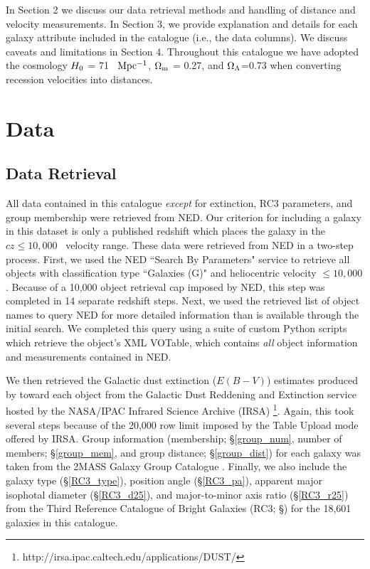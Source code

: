 In Section 2 we discuss our data retrieval methods and handling of distance and velocity measurements. In Section 3, we provide explanation and details for each galaxy attribute included in the catalogue (i.e., the data columns). We discuss caveats and limitations in Section 4. Throughout this catalogue we have adopted the cosmology $H_{\rm 0}$ = 71 \kms ~$\rm Mpc^{-1}$, $\rm \Omega_m$ = 0.27, and $\rm \Omega_{\Lambda}$=0.73 when converting recession velocities into distances.

\section{Data}

\subsection{Data Retrieval}

All data contained in this catalogue \emph{except} for extinction, RC3 parameters, and group membership were retrieved from NED. Our criterion for including a galaxy in this dataset is only a published redshift which places the galaxy in the $cz \leq 10,000$ \kms~velocity range.  These data were retrieved from NED in a two-step process. First, we used the NED ``Search By Parameters" service to retrieve all objects with classification type ``Galaxies (G)" and heliocentric velocity $\leq 10,000$ \kms. Because of a 10,000 object retrieval cap imposed by NED, this step was completed in 14 separate redshift steps. Next, we used the retrieved list of object names to query NED for more detailed information than is available through the initial search. We completed this query using a suite of custom Python scripts which retrieve the object's XML VOTable, which contains \emph{all} object information and measurements contained in NED. 

We then retrieved the Galactic dust extinction ($E(B-V)$) estimates produced by \cite{schlafly2011} toward each object from the Galactic Dust Reddening and Extinction service hosted by the NASA/IPAC Infrared Science Archive (IRSA) \footnote{http://irsa.ipac.caltech.edu/applications/DUST/}. Again, this took several steps because of the 20,000 row limit imposed by the Table Upload mode offered by IRSA. Group information (membership; \S \ref{group_num}, number of members; \S \ref{group_mem}, and group distance; \S \ref{group_dist}) for each galaxy was taken from the 2MASS Galaxy Group Catalogue \cite{tully2015}. Finally, we also include the galaxy type (\S \ref{RC3_type}), position angle (\S \ref{RC3_pa}), apparent major isophotal diameter (\S \ref{RC3_d25}), and major-to-minor axis ratio (\S \ref{RC3_r25}) from the Third Reference Catalogue of Bright Galaxies (RC3; \S \citealt{RC3}) for the 18,601 galaxies in this catalogue.

